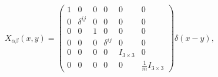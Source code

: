\begin{equation}
\label{x} X_{\alpha\beta}(x,y)=\left(
\begin{array}{cccccc}
1 & 0 & 0 & 0 & 0 & 0 \\
0 & \delta^{ij} & 0 & 0 &  0 & 0 \\
0 & 0 & 1 & 0 & 0 & 0 \\
0 & 0 & 0 & \delta^{ij}& 0 & 0 \\
0 & 0 & 0 & 0 & I_{3\times 3} & 0 \\
0 & 0 & 0 & 0 & 0 & \frac{1}{m}I_{3\times 3}
\end{array} \right)\delta(x-y),
\end{equation}

